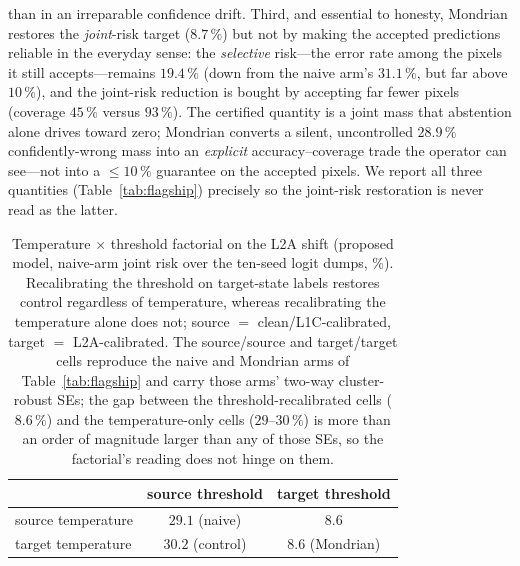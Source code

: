 \documentclass[preprint,3p,times]{elsarticle}
\begin{document}
than in an irreparable confidence drift. Third, and essential to honesty, Mondrian restores the \emph{joint}-risk target ($8.7\,\%$) but not by making the accepted predictions reliable in the everyday sense: the \emph{selective} risk---the error rate among the pixels it still accepts---remains $19.4\,\%$ (down from the naive arm's $31.1\,\%$, but far above $10\,\%$), and the joint-risk reduction is bought by accepting far fewer pixels (coverage $45\,\%$ versus $93\,\%$). The certified quantity is a joint mass that abstention alone drives toward zero; Mondrian converts a silent, uncontrolled $28.9\,\%$ confidently-wrong mass into an \emph{explicit} accuracy--coverage trade the operator can see---not into a $\leq\!10\,\%$ guarantee on the accepted pixels. We report all three quantities (Table~\ref{tab:flagship}) precisely so the joint-risk restoration is never read as the latter.

\begin{table}[t]
\centering
\caption{Temperature $\times$ threshold factorial on the L2A shift (proposed model, naive-arm joint risk over the ten-seed logit dumps, \%). Recalibrating the threshold on target-state labels restores control regardless of temperature, whereas recalibrating the temperature alone does not; source $=$ clean/L1C-calibrated, target $=$ L2A-calibrated. The source/source and target/target cells reproduce the naive and Mondrian arms of Table~\ref{tab:flagship} and carry those arms' two-way cluster-robust SEs; the gap between the threshold-recalibrated cells ($8.6\,\%$) and the temperature-only cells ($29$--$30\,\%$) is more than an order of magnitude larger than any of those SEs, so the factorial's reading does not hinge on them.}
\label{tab:factorial}
\begin{tabular}{lcc}
\toprule
 & source threshold & target threshold \\
\midrule
source temperature & $29.1$ (naive) & $8.6$ \\
target temperature & $30.2$ (control) & $8.6$ (Mondrian) \\
\bottomrule
\end{tabular}
\end{table}
\end{document}
